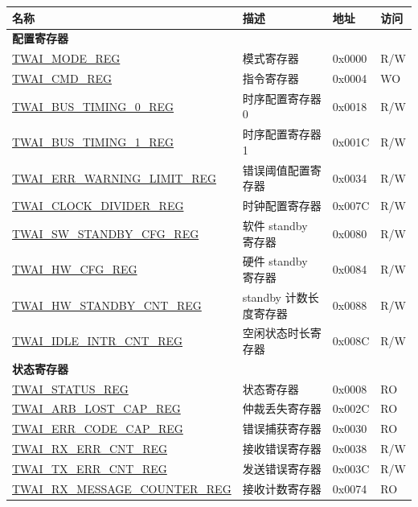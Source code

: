 \begin{longtable}{ | p{6cm} | p{5.2cm} | p{1.3cm} | p{2cm} | }
\hline\rowcolor{lightgray}
\textbf{名称} & \textbf{描述} &  \textbf{地址} & \textbf{访问} \\ \hline
\endhead
\multicolumn{4}{|l|}{\textbf{配置寄存器}} \\ \hline
\hyperref[regdesc:TWAIMODEREG]{TWAI\_MODE\_REG} & 模式寄存器 & 0x0000 & R/W \\ \hline
\hyperref[regdesc:TWAICMDREG]{TWAI\_CMD\_REG} & 指令寄存器 & 0x0004 & WO \\ \hline
\hyperref[regdesc:TWAIBUSTIMING0REG]{TWAI\_BUS\_TIMING\_0\_REG} & 时序配置寄存器 0 & 0x0018 & R/W \\ \hline
\hyperref[regdesc:TWAIBUSTIMING1REG]{TWAI\_BUS\_TIMING\_1\_REG} & 时序配置寄存器 1 & 0x001C & R/W \\ \hline
\hyperref[regdesc:TWAIERRWARNINGLIMITREG]{TWAI\_ERR\_WARNING\_LIMIT\_REG} & 错误阈值配置寄存器 & 0x0034 & R/W \\ \hline
\hyperref[regdesc:TWAICLOCKDIVIDERREG]{TWAI\_CLOCK\_DIVIDER\_REG} & 时钟配置寄存器 & 0x007C & R/W \\ \hline
\hyperref[regdesc:TWAISWSTANDBYCFGREG]{TWAI\_SW\_STANDBY\_CFG\_REG} & 软件 standby 寄存器 & 0x0080 & R/W \\ \hline
\hyperref[regdesc:TWAIHWCFGREG]{TWAI\_HW\_CFG\_REG} & 硬件 standby 寄存器 & 0x0084 & R/W \\ \hline
\hyperref[regdesc:TWAIHWSTANDBYCNTREG]{TWAI\_HW\_STANDBY\_CNT\_REG} & standby 计数长度寄存器 & 0x0088 & R/W \\ \hline
\hyperref[regdesc:TWAIIDLEINTRCNTREG]{TWAI\_IDLE\_INTR\_CNT\_REG} & 空闲状态时长寄存器 & 0x008C & R/W \\ \hline
\multicolumn{4}{|l|}{\textbf{状态寄存器}} \\ \hline
\hyperref[regdesc:TWAISTATUSREG]{TWAI\_STATUS\_REG} & 状态寄存器 & 0x0008 & RO \\ \hline
\hyperref[regdesc:TWAIARBLOSTCAPREG]{TWAI\_ARB\_LOST\_CAP\_REG} & 仲裁丢失寄存器 & 0x002C & RO \\ \hline
\hyperref[regdesc:TWAIERRCODECAPREG]{TWAI\_ERR\_CODE\_CAP\_REG} & 错误捕获寄存器 & 0x0030 & RO \\ \hline
\hyperref[regdesc:TWAIRXERRCNTREG]{TWAI\_RX\_ERR\_CNT\_REG} & 接收错误寄存器 & 0x0038 & R/W \\ \hline
\hyperref[regdesc:TWAITXERRCNTREG]{TWAI\_TX\_ERR\_CNT\_REG} & 发送错误寄存器 & 0x003C & R/W \\ \hline
\hyperref[regdesc:TWAIRXMESSAGECOUNTERREG]{TWAI\_RX\_MESSAGE\_COUNTER\_REG} & 接收计数寄存器 & 0x0074 & RO \\ \hline

\end{longtable}
